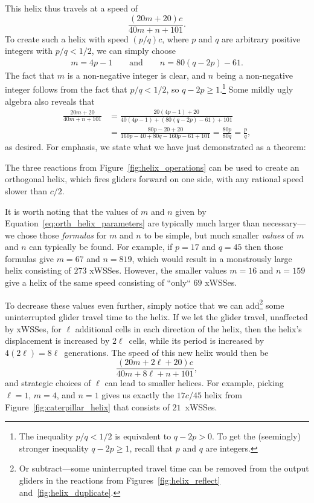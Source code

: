 This helix thus travels at a speed of
\[
	\frac{(20m + 20)c}{40m + n + 101}.
\]
To create such a helix with speed $(p/q)c$, where $p$ and $q$ are arbitrary positive integers with $p/q < 1/2$, we can simply choose
\begin{align}\label{eq:orth_helix_parameters}
	m = 4p - 1 \qquad \text{and} \qquad n = 80(q - 2p) - 61.
\end{align}
The fact that $m$ is a non-negative integer is clear, and $n$ being a non-negative integer follows from the fact that $p/q < 1/2$, so $q - 2p \geq 1$.\footnote{The inequality $p/q < 1/2$ is equivalent to $q - 2p > 0$. To get the (seemingly) stronger inequality $q - 2p \geq 1$, recall that $p$ and $q$ are integers.} Some mildly ugly algebra also reveals that
\begin{align*}
	\frac{20m + 20}{40m + n + 101} & = \frac{20(4p - 1) + 20}{40(4p - 1) + (80(q - 2p) - 61) + 101} \\
	& = \frac{80p - 20 + 20}{160p - 40 + 80q - 160p - 61 + 101} = \frac{80p}{80q} = \frac{p}{q},
\end{align*}
as desired. For emphasis, we state what we have just demonstrated as a theorem:

\begin{theorem}\label{thm:universality_orthogonal_helices}
	The three reactions from Figure~\ref{fig:helix_operations} can be used to create an orthogonal helix, which fires gliders forward on one side, with any rational speed slower than $c/2$.
\end{theorem}

It is worth noting that the values of $m$ and $n$ given by Equation~\eqref{eq:orth_helix_parameters} are typically much larger than necessary---we chose those \emph{formulas} for $m$ and $n$ to be simple, but much smaller \emph{values} of $m$ and $n$ can typically be found. For example, if $p = 17$ and $q = 45$ then those formulas give $m = 67$ and $n = 819$, which would result in a monstrously large helix consisting of $273$ xWSSes. However, the smaller values $m = 16$ and $n = 159$ give a helix of the same speed consisting of ``only`` $69$ xWSSes.

To decrease these values even further, simply notice that we can add\footnote{Or subtract---some uninterrupted travel time can be removed from the output gliders in the reactions from Figures~\ref{fig:helix_reflect} and~\ref{fig:helix_duplicate}.} some uninterrupted glider travel time to the helix. If we let the glider travel, unaffected by xWSSes, for $\ell$ additional cells in each direction of the helix, then the helix's displacement is increased by $2\ell$~cells, while its period is increased by $4(2\ell) = 8\ell$~generations. The speed of this new helix would then be
\[
	\frac{(20m + 2\ell + 20)c}{40m + 8\ell + n + 101},
\]
and strategic choices of $\ell$ can lead to smaller helices. For example, picking $\ell = 1$, $m = 4$, and $n = 1$ gives us exactly the $17c/45$ helix from Figure~\ref{fig:caterpillar_helix} that consists of $21$~xWSSes.


